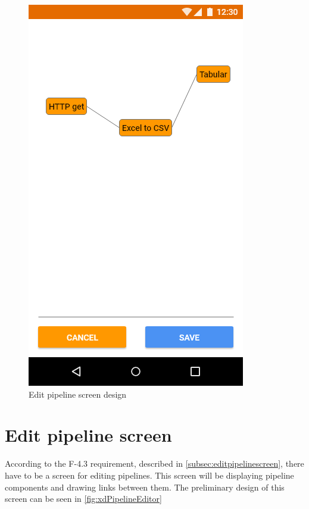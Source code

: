 \begin{figure}
\begin{minipage}[b]{0.32\textwidth}
    	\includegraphics[width=\textwidth]{pics/xd/Pipeline editor.png}
    	\caption[Edit pipeline screen]{Edit pipeline screen design}\label{fig:xdPipelineEditor}
    \end{minipage}
\end{figure}

\section{Edit pipeline screen}
According to the F-4.3 requirement, described in \autoref{subsec:editpipelinescreen}, there have to be a screen for editing pipelines.
This screen will be displaying pipeline components and drawing links between them.
The preliminary design of this screen can be seen in \autoref{fig:xdPipelineEditor}

